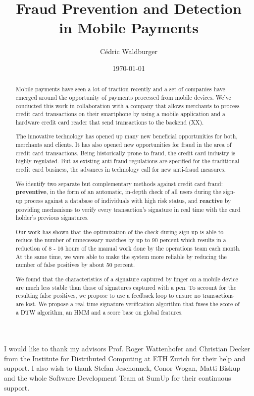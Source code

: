 \documentclass[a4paper, oneside]{csthesis}
\title{Fraud Prevention and Detection\\[5pt] in Mobile Payments}
\author{C\'{e}dric Waldburger}
\institute{Distributed Computing Group \\[2pt]
Computer Engineering and Networks Laboratory \\[2pt]
ETH Zurich}
\date{\today}
\begin{document}
\frontmatter
\maketitle %

\cleardoublepage

\begin{acknowledgements}

  I would like to thank my advisors Prof. Roger Wattenhofer and Christian Decker from the Institute for Distributed Computing at ETH Zurich for their help and support. I also wish to thank Stefan Jeschonnek, Conor Wogan, Matti Biskup and the whole Software Development Team at SumUp for their continuous support.

\end{acknowledgements}


\begin{abstract}
    Mobile payments have seen a lot of traction recently and a set of companies have emerged around the opportunity of payments processed from mobile devices. We've conducted this work in collaboration with a company that allows merchants to process credit card transactions on their smartphone by using a mobile application and a hardware credit card reader that send transactions to the backend (XX).

    The innovative technology has opened up many new beneficial opportunities for both, merchants and clients. It has also opened new opportunities for fraud in the area of credit card transactions. Being historically prone to fraud, the credit card industry is highly regulated. But as existing anti-fraud regulations are specified for the traditional credit card business, the advances in technology call for new anti-fraud measures.

    We identify two  separate but complementary methods against credit card fraud: \textbf{preventive}, in the form of an automatic, in-depth check of all users during the sign-up process against a database of individuals with high risk status, and \textbf{reactive} by providing mechanisms to verify every transaction's signature in real time with the card holder's previous signatures.

    Our work has shown that the optimization of the check during sign-up is able to reduce the number of unnecessary matches by up to 90 percent which results in a reduction of 8 - 16 hours of the manual work done by the operations team each month. At the same time, we were able to make the system more reliable by reducing the number of false positives by about 50 percent.

    We found that the characteristics of a signature captured by finger on a mobile device are much less stable than those of signatures captured with a pen. To account for the resulting false positives, we propose to use a feedback loop to ensure no transactions are lost. We propose a real time signature verification algorithm that fuses the score of a DTW algorithm, an HMM and a score base on global features.

\end{abstract}
\end{document}
